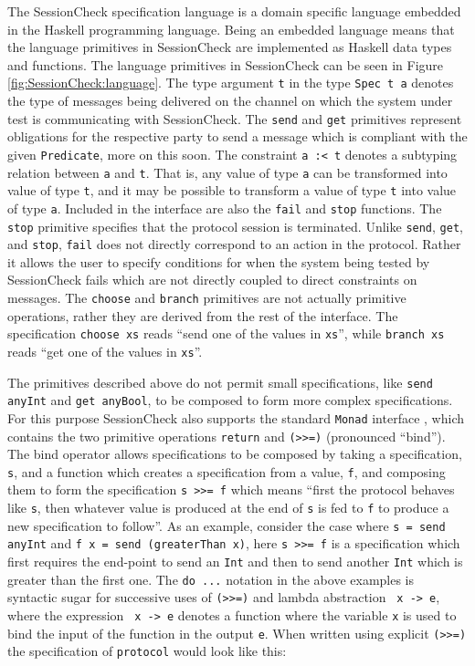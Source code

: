 \documentclass{article}
\begin{document}
The SessionCheck specification language is a domain specific language embedded in the Haskell \cite{Haskell}
programming language.
%
Being an embedded language means that the language primitives in SessionCheck are
implemented as Haskell data types and functions.
%
The language primitives in SessionCheck can be seen in Figure \ref{fig:SessionCheck:language}.
%
The type argument \texttt{t} in the type \texttt{Spec t a} denotes the type of messages
being delivered on the channel on which the system under test is communicating
with SessionCheck.
%
The \texttt{send} and \texttt{get} primitives represent obligations for the respective party to send a message
which is compliant with the given \texttt{Predicate}, more on this soon.
%
The constraint \texttt{a :< t} denotes a subtyping relation between \texttt{a} and \texttt{t}.
%
That is, any value of type \texttt{a} can be transformed into value of type \texttt{t}, and it may be
possible to transform a value of type \texttt{t} into value of type \texttt{a}.
%
Included in the interface are also the \texttt{fail} and \texttt{stop} functions.
%
The \texttt{stop} primitive specifies that the protocol session is terminated.
%
Unlike \texttt{send}, \texttt{get}, and \texttt{stop}, \texttt{fail} does not directly correspond to an action in the protocol.
%
Rather it allows the user to specify conditions for when the system being tested by SessionCheck fails
which are not directly coupled to direct constraints on messages.
%
The \texttt{choose} and \texttt{branch} primitives are not actually primitive operations, rather they are derived from
the rest of the interface.
%
The specification \texttt{choose xs} reads ``send one of the values in \texttt{xs}'', while \texttt{branch xs} reads ``get one
of the values in \texttt{xs}''.

The primitives described above do not permit small specifications, like \texttt{send anyInt} and \texttt{get anyBool}, to
be composed to form more complex specifications.
%
For this purpose SessionCheck also supports the standard \texttt{Monad} interface \cite{WadlerMonad}, which contains the
two primitive operations \texttt{return} and \texttt{(>>=)} (pronounced ``bind'').
%
The bind operator allows specifications to be composed by taking a specification, \texttt{s}, and a function which
creates a specification from a value, \texttt{f}, and composing them to form the specification \texttt{s >>= f} which means
``first the protocol behaves like \texttt{s}, then whatever value is produced at the end of \texttt{s} is fed to \texttt{f} to produce
a new specification to follow''.
%
As an example, consider the case where \texttt{s = send anyInt} and \texttt{f x = send (greaterThan x)}, here \texttt{s >>= f} is
a specification which first requires the end-point to send an \texttt{Int} and then to send another \texttt{Int} which is greater
than the first one.
%
The \texttt{do ...} notation in the above examples is syntactic sugar for successive uses of \texttt{(>>=)} and lambda abstraction
\texttt{\ x -> e}, where the expression \texttt{\ x -> e} denotes a function where the variable \texttt{x} is used to bind the input of
the function in the output \texttt{e}.
%
When written using explicit \texttt{(>>=)} the specification of \texttt{protocol} would look like this:
%
\end{document}
